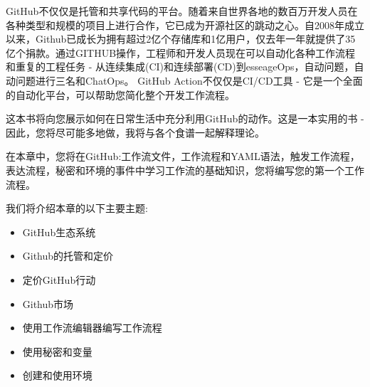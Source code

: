 GitHub不仅仅是托管和共享代码的平台。随着来自世界各地的数百万开发人员在各种类型和规模的项目上进行合作，它已成为开源社区的跳动之心。自2008年成立以来，Github已成长为拥有超过2亿个存储库和1亿用户，仅去年一年就提供了35亿个捐款。通过GITHUB操作，工程师和开发人员现在可以自动化各种工作流程和重复的工程任务 - 从连续集成(CI)和连续部署(CD)到esseageOps，自动问题，自动问题进行三名和ChatOps。 GitHub Action不仅仅是CI/CD工具 - 它是一个全面的自动化平台，可以帮助您简化整个开发工作流程。

这本书将向您展示如何在日常生活中充分利用GitHub的动作。这是一本实用的书 - 因此，您将尽可能多地做，我将与各个食谱一起解释理论。

在本章中，您将在GitHub:工作流文件，工作流程和YAML语法，触发工作流程，表达流程，秘密和环境的事件中学习工作流的基础知识，您将编写您的第一个工作流程。

我们将介绍本章的以下主要主题:

\begin{itemize}
\item 
GitHub生态系统

\item 
Github的托管和定价

\item 
定价GitHub行动

\item 
Github市场

\item 
使用工作流编辑器编写工作流程

\item 
使用秘密和变量

\item 
创建和使用环境
\end{itemize}